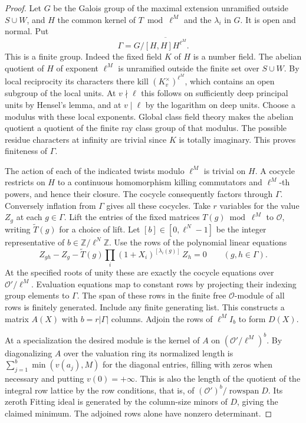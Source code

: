 \documentclass[a4paper,11pt]{article}
\theoremstyle{definition}
\theoremstyle{remark}
\newcommand{\ZZ}{\mathbb Z}\newcommand{\ord}{\operatorname{ord}}
\numberwithin{equation}{section}
\begin{document}
\begin{proof}
Let \(G\) be the Galois group of the maximal extension unramified outside
\(S\cup W\), and \(H\) the common kernel of \(T\bmod\ell^M\) and the
\(\lambda_i\) in \(G\). It is open and normal. Put
\[
              \Gamma=G/\overline{[H,H]H^{\ell^M}}.
\]
This is a finite group. Indeed the fixed field \(K\) of \(H\) is a
number field. The abelian quotient of \(H\) of exponent \(\ell^M\) is
unramified outside the finite set over \(S\cup W\). By local reciprocity
its characters there kill \((K_v^\times)^{\ell^M}\), which contains
an open subgroup of the local units. At \(v\nmid\ell\) this follows
on sufficiently deep principal units by Hensel's lemma, and at
\(v\mid\ell\) by the logarithm on deep units. Choose a modulus with
these local exponents. Global class field theory makes the abelian
quotient a quotient of the finite ray class group of that modulus.
The possible residue characters at infinity are trivial since \(K\)
is totally imaginary. This proves finiteness of \(\Gamma\).

The action of each of the indicated twists modulo \(\ell^M\) is trivial
on \(H\). A cocycle restricts on \(H\) to a continuous homomorphism
killing commutators and \(\ell^M\)-th powers, and hence their closure.
The cocycle consequently factors through \(\Gamma\). Conversely
inflation from \(\Gamma\) gives all these cocycles. Take \(r\) variables
for the value \(Z_g\) at each \(g\in\Gamma\). Lift the entries of the
fixed matrices \(T(g)\bmod\ell^M\) to \(\mathcal O\), writing
\(\widetilde T(g)\) for a choice of lift. Let \([b]\in[0,\ell^N-1]\)
be the integer representative of \(b\in\ZZ/\ell^N\ZZ\). Use the rows
of the polynomial linear equations
\[
 Z_{gh}-Z_g-\widetilde T(g)
                 \prod_i(1+X_i)^{[\lambda_i(g)]}\,Z_h=0
                       \qquad(g,h\in\Gamma).
\]
At the specified roots of unity these are exactly the cocycle equations
over \(\mathcal O'/\ell^M\). Evaluation equations map to constant rows
by projecting their indexing group elements to \(\Gamma\). The span of
these rows in the finite free \(\mathcal O\)-module of all rows is
finitely generated. Include any finite generating list. This constructs
a matrix \(A(X)\) with \(b=r|\Gamma|\) columns. Adjoin the rows of
\(\ell^M I_b\) to form \(D(X)\).

At a specialization the desired module is the kernel of \(A\) on
\((\mathcal O'/\ell^M)^b\). By diagonalizing \(A\) over the valuation
ring its normalized length is \(\sum_{j=1}^b\min(v(a_j),M)\) for the
diagonal entries, filling with zeros when necessary and putting
\(v(0)=+\infty\). This is also the length of the quotient of the
integral row lattice by the row conditions, that is, of
\((\mathcal O')^b/\operatorname{rowspan}D\). Its zeroth Fitting ideal
is generated by the column-size minors of \(D\), giving the claimed
minimum. The adjoined rows alone have nonzero determinant.
\end{proof}
\end{document}
